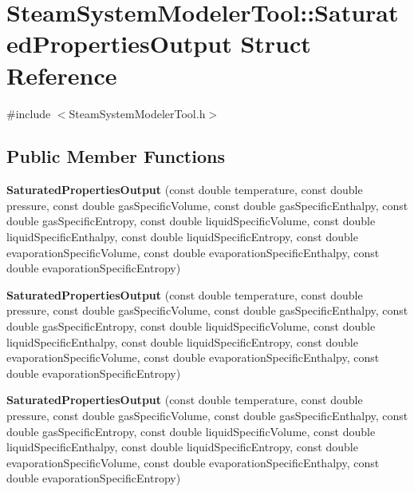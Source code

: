\hypertarget{struct_steam_system_modeler_tool_1_1_saturated_properties_output}{}\section{Steam\+System\+Modeler\+Tool\+:\+:Saturated\+Properties\+Output Struct Reference}
\label{struct_steam_system_modeler_tool_1_1_saturated_properties_output}


{\ttfamily \#include $<$Steam\+System\+Modeler\+Tool.\+h$>$}

\subsection*{Public Member Functions}
\begin{DoxyCompactItemize}
\item 
\mbox{\label{struct_steam_system_modeler_tool_1_1_saturated_properties_output_ae289bc16069f4561e63d60c4983c9f78}} 
{\bfseries Saturated\+Properties\+Output} (const double temperature, const double pressure, const double gas\+Specific\+Volume, const double gas\+Specific\+Enthalpy, const double gas\+Specific\+Entropy, const double liquid\+Specific\+Volume, const double liquid\+Specific\+Enthalpy, const double liquid\+Specific\+Entropy, const double evaporation\+Specific\+Volume, const double evaporation\+Specific\+Enthalpy, const double evaporation\+Specific\+Entropy)
\item 
\mbox{\label{struct_steam_system_modeler_tool_1_1_saturated_properties_output_ae289bc16069f4561e63d60c4983c9f78}} 
{\bfseries Saturated\+Properties\+Output} (const double temperature, const double pressure, const double gas\+Specific\+Volume, const double gas\+Specific\+Enthalpy, const double gas\+Specific\+Entropy, const double liquid\+Specific\+Volume, const double liquid\+Specific\+Enthalpy, const double liquid\+Specific\+Entropy, const double evaporation\+Specific\+Volume, const double evaporation\+Specific\+Enthalpy, const double evaporation\+Specific\+Entropy)
\item 
\mbox{\label{struct_steam_system_modeler_tool_1_1_saturated_properties_output_ae289bc16069f4561e63d60c4983c9f78}} 
{\bfseries Saturated\+Properties\+Output} (const double temperature, const double pressure, const double gas\+Specific\+Volume, const double gas\+Specific\+Enthalpy, const double gas\+Specific\+Entropy, const double liquid\+Specific\+Volume, const double liquid\+Specific\+Enthalpy, const double liquid\+Specific\+Entropy, const double evaporation\+Specific\+Volume, const double evaporation\+Specific\+Enthalpy, const double evaporation\+Specific\+Entropy)
\end{DoxyCompactItemize}
